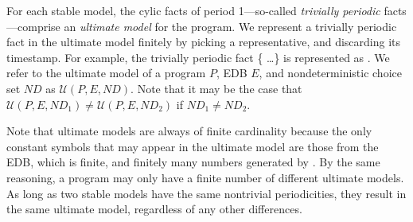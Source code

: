 

\begin{definition}
For each stable model, the cylic facts of period 1---so-called {\em trivially periodic} facts---comprise an {\em ultimate model} for the program.  We represent a trivially periodic fact in the ultimate model finitely by picking a representative, and discarding its timestamp.
For example, the trivially periodic fact \{ \ldots\} is represented as .  We refer to the ultimate model of a program $P$, EDB $E$, and nondeterministic choice set $ND$ as $\mathcal{U}(P, E, ND)$.  Note that it may be the case that $\mathcal{U}(P, E, ND_1) \neq \mathcal{U}(P, E, ND_2)$ if $ND_1 \neq ND_2$.
\end{definition}

Note that ultimate models are always of finite cardinality because the only constant symbols that may appear in the ultimate model are those from the EDB, which is finite, and finitely many numbers generated by .  By the same reasoning, a \lang program may only have a finite number of different ultimate models.  As long as two stable models have the same nontrivial periodicities, they result in the same ultimate model, regardless of any other differences.

%


